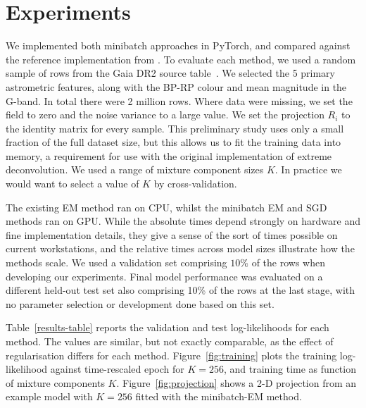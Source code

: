 \section{Experiments}
\label{sec:experiments}

We implemented both minibatch approaches in PyTorch, and compared against the reference implementation from \citet{bovyExtremeDeconvolutionInferring2011}.
To evaluate each method, we used a random sample of rows from the Gaia DR2 source table~\cite{brownGaiaDataRelease2018}.
We selected the 5 primary astrometric features, along with the BP-RP colour and mean magnitude in the G-band.
In total there were 2 million rows.
Where data were missing, we set the field to zero and the noise variance to a large value.
We set the projection $R_i$ to the identity matrix for every sample.
This preliminary study uses only a small fraction of the full dataset size, but this allows us to fit the training data into memory, a requirement for use with the original implementation of extreme deconvolution.
We used a range of mixture component sizes $K$.
In practice we would want to select a value of $K$ by cross-validation.

The existing EM method ran on CPU, whilst the minibatch EM and SGD methods ran on GPU\@.
While the absolute times depend strongly on hardware and fine implementation details, they give a sense of the sort of times possible on current workstations, and the relative times across model sizes illustrate how the methods scale.
We used a validation set comprising $10\%$ of the rows when developing our experiments.
Final model performance was evaluated on a different held-out test set also comprising 10\% of the rows at the last stage, with no parameter selection or development done based on this set.

Table~\ref{results-table} reports the validation and test log-likelihoods for each method.
The values are similar, but not exactly comparable, as the effect of regularisation differs for each method.
Figure~\ref{fig:training} plots the training log-likelihood against time-rescaled epoch for $K=256$, and training time as function of mixture components $K$.
Figure~\ref{fig:projection} shows a 2-D projection from an example model with $K=256$ fitted with the minibatch-EM method.

